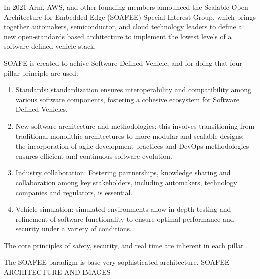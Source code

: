 In 2021 Arm, AWS, and other founding members announced the Scalable Open Architecture for Embedded Edge (SOAFEE) Special Interest Group, which brings together automakers, semiconductor, and cloud technology leaders to define a new open-standards based architecture to implement the lowest levels of a software-defined vehicle stack. \cite{DevelopersWorkflow}

SOAFE is created to achive Software Defined Vehicle, and for doing that four-pillar principle are used:
\begin{enumerate}
    \item Standards: standardization ensures interoperability and compatibility among various software components, fostering a cohesive ecosystem for Software Defined Vehicles.
    \item New software architecture and methodologies: this involves transitioning from traditional monolithic architectures to more modular and scalable designs; the incorporation of agile development practices and DevOps methodologies ensures efficient and continuous software evolution.
    \item Industry collaboration: Fostering partnerships, knowledge sharing and collaboration among key stakeholders, including automakers, technology companies and regulators, is essential.
    \item Vehicle simulation: simulated environments allow in-depth testing and refinement of software functionality to ensure optimal performance and security under a variety of conditions.
\end{enumerate}
The core principles of safety, security, and real time are inherent in each pillar \cite{SoafeeProject}.

The SOAFEE paradigm is base very sophisticated architecture.
 SOAFEE ARCHITECTURE AND IMAGES